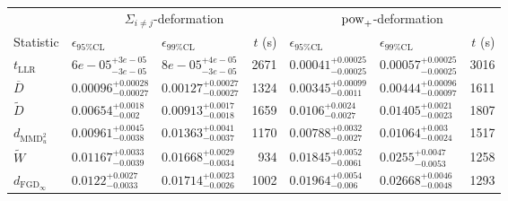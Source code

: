 \begin{landscape}
    \begin{tabular}{l|llr|llr}
\toprule
\multicolumn{1}{c}{} & \multicolumn{3}{c}{$\Sigma_{i\neq j}$-deformation} & \multicolumn{3}{c}{$\rm{pow}_{+}$-deformation} \\
Statistic & $\epsilon_{95\%\mathrm{CL}}$ & $\epsilon_{99\%\mathrm{CL}}$ & $t$ (s) & $\epsilon_{95\%\mathrm{CL}}$ & $\epsilon_{99\%\mathrm{CL}}$ & $t$ (s) \\
\midrule
$t_{\mathrm{LLR}}$ & $6e-05_{-3e-05}^{+3e-05}$ & $8e-05_{-3e-05}^{+4e-05}$ & 2671 & $0.00041_{-0.00025}^{+0.00025}$ & $0.00057_{-0.00025}^{+0.00025}$ & 3016 \\
$\overline{D}$ & $0.00096_{-0.00027}^{+0.00028}$ & $0.00127_{-0.00027}^{+0.00027}$ & 1324 & $0.00345_{-0.0011}^{+0.00099}$ & $0.00444_{-0.00097}^{+0.00096}$ & 1611 \\
$\widetilde{D}$ & $0.00654_{-0.002}^{+0.0018}$ & $0.00913_{-0.0018}^{+0.0017}$ & 1659 & $0.0106_{-0.0027}^{+0.0024}$ & $0.01405_{-0.0023}^{+0.0021}$ & 1807 \\
$d_{\mathrm{MMD}^{2}_{u}}$ & $0.00961_{-0.0038}^{+0.0045}$ & $0.01363_{-0.0037}^{+0.0041}$ & 1170 & $0.00788_{-0.0027}^{+0.0032}$ & $0.01064_{-0.0024}^{+0.003}$ & 1517 \\
$\widetilde{W}$ & $0.01167_{-0.0039}^{+0.0033}$ & $0.01668_{-0.0034}^{+0.0029}$ & 934 & $0.01845_{-0.0061}^{+0.0052}$ & $0.0255_{-0.0053}^{+0.0047}$ & 1258 \\
$d_{\mathrm{FGD}_{\infty}}$ & $0.0122_{-0.0033}^{+0.0027}$ & $0.01714_{-0.0026}^{+0.0023}$ & 1002 & $0.01964_{-0.006}^{+0.0054}$ & $0.02668_{-0.0048}^{+0.0046}$ & 1293 \\
\bottomrule
\end{tabular}


\end{landscape}
